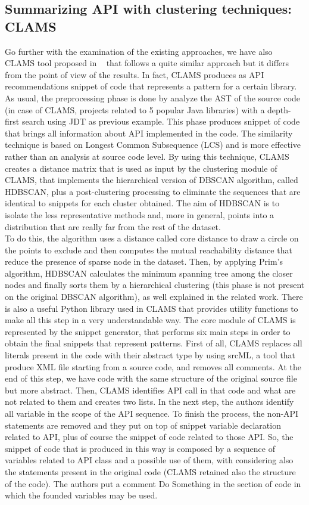  


\subsection{Summarizing API with clustering techniques: CLAMS}
Go further with the examination of the existing approaches, we have also CLAMS tool proposed in  ~\cite{katirtzis_summarizing_2018} that follows a quite similar approach but it differs from the point of view of the results. In fact, CLAMS produces as API recommendations snippet of code that represents a pattern for a certain library. As usual, the preprocessing phase is done by analyze the AST of the source code (in case of CLAMS, projects related to 5 popular Java libraries) with a depth-first search using JDT as previous example. This phase produces snippet of code that brings all information about API implemented in the code. The similarity technique is based on Longest Common Subsequence (LCS) and is more effective rather than an analysis at source code level. By using this technique, CLAMS creates a distance matrix that is used as input by the clustering module of CLAMS, that implements the hierarchical version of DBSCAN algorithm, called HDBSCAN, plus a post-clustering processing to eliminate the sequences that are identical to snippets for each cluster obtained. The aim of HDBSCAN is to isolate the less representative methods and, more in general, points into a distribution that are really far from the rest of the dataset. \\
To do this, the algorithm uses a distance called core distance to draw a circle on the points to exclude and then computes the mutual reachability distance that reduce the presence of sparse node in the dataset. Then, by applying Prim's algorithm, HDBSCAN calculates the minimum spanning tree among the closer nodes and finally sorts them by a hierarchical clustering (this phase is not present on the original DBSCAN algorithm), as well explained in the related work. There is also a useful Python library used in CLAMS that provides utility functions to make all this step in a very understandable way. The core module of CLAMS is represented by the snippet generator, that performs six main steps in order to obtain the final snippets that represent patterns. First of all, CLAMS replaces all literals present in the code with their abstract type by using srcML, a tool that produce XML file starting from a source code, and removes all comments. At the end of this step, we have code with the same structure of the original source file but more abstract. Then, CLAMS identifies API call in that code and what are not related to them and creates two lists. In the next step, the authors identify all variable in the scope of the API sequence. To finish the process, the non-API statements are removed and they put on top of snippet variable declaration related to API, plus of course the snippet of code related to those API. So, the snippet of code that is produced in this way is composed by a sequence of variables related to API class and a possible use of them, with considering also the statements present in the original code (CLAMS retained also the structure of the code). The authors put a comment Do Something in the section of code in which the founded variables may be used. \newline
